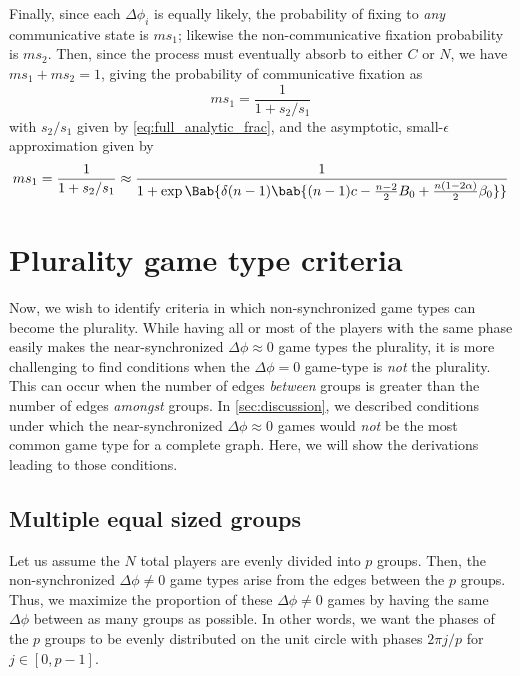 Finally, since each $\Delta \phi_i$ is equally likely,
the probability of fixing to \emph{any}
communicative state is $m s_1$;
likewise the non-communicative fixation probability is $m s_2$.
Then, since the process must eventually absorb to either $C$ or $N$,
we have
$m s_1 + m s_2 = 1$, giving the probability of communicative fixation as
\begin{equation}
  m s_1 = \frac{1}{1 + s_2/s_1}
  \label{eq:full_analytic}
\end{equation}
with $s_2/s_1$ given by \cref{eq:full_analytic_frac},
and the asymptotic, small-$\epsilon$ approximation given by
\begin{equation}
  m s_1 = \frac{1}{1 + s_2/s_1}
  \approx
  \frac{1}
  {1 + \exp \Bab{\delta (n-1) \bab{
    (n-1) c
    - \frac{n-2}{2} B_0
    +
    \frac{n (1 - 2 \alpha)}{2} \beta_0
    }}
  }
  \label{eq:analytic_first_term}
\end{equation}

\section{Plurality game type criteria}
Now, we wish to identify criteria in which
non-synchronized game types can become the plurality.
While having all or most of the players with the same phase
easily makes the near-synchronized $\Delta \phi \approx 0$
game types the plurality,
it is more challenging to find conditions
when the $\Delta \phi = 0$ game-type is \emph{not} the plurality.
This can occur when the number of edges \emph{between} groups
is greater than the number of edges \emph{amongst} groups.
In \cref{sec:discussion}, we described conditions under which
the near-synchronized $\Delta \phi \approx 0$ games would \emph{not} be
the most common game type for a complete graph.
Here, we will show the derivations leading to those conditions.

\subsection{Multiple equal sized groups}\label{sec:multiple_equal_groups}
Let us assume the $N$ total players are evenly divided
into $p$ groups.
Then, the non-synchronized $\Delta \phi \neq 0$ game types
arise from the edges between the $p$ groups.
Thus, we maximize the proportion of these $\Delta \phi \neq 0$ games
by having the same $\Delta \phi$ between as many groups as possible.
In other words, we want the phases of the $p$ groups
to be evenly distributed on the unit circle with phases $2 \pi j/p$
for $j \in [0,p-1]$.

